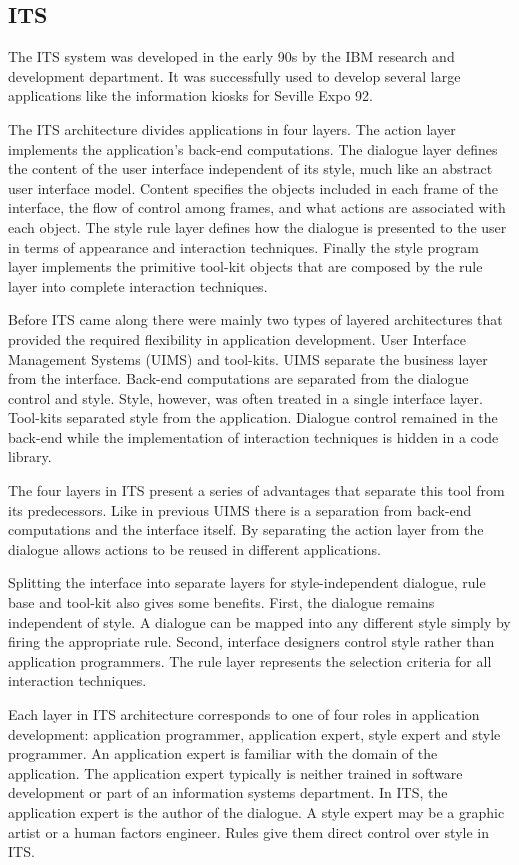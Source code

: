 \subsection{ITS}
\label{subsection:ITS}
The ITS\cite{ITS} system was developed in the early 90s by the IBM research and development department. It was successfully used to develop several large applications like the information kiosks for Seville Expo 92.

The ITS architecture divides applications in four layers. The action layer implements the application's back-end computations. The dialogue layer defines the content of the user interface independent of its style, much like an abstract user interface model. Content specifies the objects included in each frame of the interface, the flow of control among frames, and what actions are associated with each object. The style rule layer defines how the dialogue is presented to the user in terms of appearance and interaction techniques. Finally the style program layer implements the primitive tool-kit objects that are composed by the rule layer into complete interaction techniques.

Before ITS came along there were mainly two types of layered architectures that provided the required flexibility in application development. User Interface Management Systems (UIMS) and tool-kits. UIMS separate the business layer from the interface. Back-end computations are separated from the dialogue control and style. Style, however, was often treated in a single interface layer. Tool-kits separated style from the application. Dialogue control remained in the back-end while the implementation of interaction techniques is hidden in a code library.

The four layers in ITS present a series of advantages that separate this tool from its predecessors. Like in previous UIMS there is a separation from back-end computations and the interface itself. By separating the action layer from the dialogue allows actions to be reused in different applications.

Splitting the interface into separate layers for style-independent dialogue, rule base and tool-kit also gives some benefits. First, the dialogue remains independent of style. A dialogue can be mapped into any different style simply by firing the appropriate rule. Second, interface designers control style rather than application programmers. The rule layer represents the selection criteria for all interaction techniques.

Each layer in ITS architecture corresponds to one of four roles in application development: application programmer, application expert, style expert and style programmer. An application expert is familiar with the domain of the application. The application expert typically is neither trained in software development or part of an information systems department. In ITS, the application expert is the author of the dialogue. A style expert may be a graphic artist or a human factors engineer. Rules give them direct control over style in ITS.

